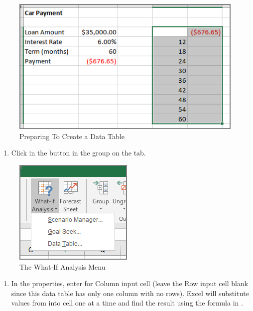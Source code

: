 \begin{figure}[H]
	\centering
	\includegraphics[width=\maxwidth{.95\linewidth}]{gfx/ch07_fig45}
	\caption{Preparing To Create a Data Table}
	\label{07:fig45}
\end{figure}

\begin{enumerate}[resume]	
	\item Click  in the  button in the  group on the  tab.
\end{enumerate}

\begin{figure}[H]
	\centering
	\includegraphics[width=\maxwidth{.95\linewidth}]{gfx/ch07_fig46}
	\caption{The What-If Analysis Menu}
	\label{07:fig46}
\end{figure}

\begin{enumerate}[resume]	
	\item In the  properties, enter  for Column input cell (leave the Row input cell blank since this data table has only one column with no rows). Excel will substitute values from  into cell  one at a time and find the result using the formula in .
\end{enumerate}

